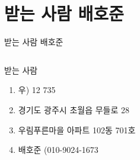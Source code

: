\documentclass[aspectratio=1610,12pt,xcolor=pdftex,dvipsnames,table,handout]{beamer}
\begin{document}
		\section{받는 사람 배호준}
		\begin{frame}[c,plain]{받는 사람 배호준}

		\begin{columns}[t]
		\begin{column}{1.0\textwidth}

			\begin{block} {받는 사람}
			\begin{enumerate}
			\item [] 우) 12 735
			\item [] 경기도 광주시 초월읍 무들로 28
			\item [] 우림푸른마을 아파트 102동 701호
			\item [] 배호준  (010-9024-1673
			\end{enumerate}
			\end{block}
		\end{column}
		\end{columns}

		\end{frame}

\end{document}
